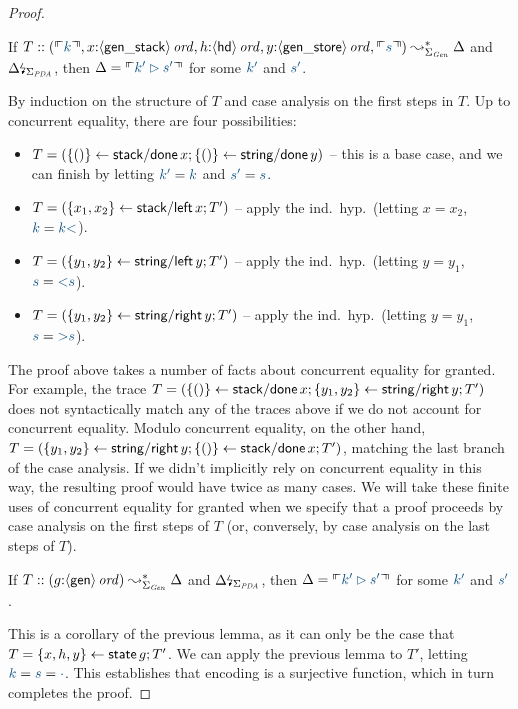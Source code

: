 \begin{proof}
\begin{lemma} If 
$T :: (\ctxinterp{k}, 
       x{:}\istrue{\susp{\sf gen\_stack}}, 
       h{:}\istrue{\susp{\sf hd}},
       y{:}\istrue{\susp{\sf gen\_store}},
       \ctxinterp{s}) 
  \leadsto^*_{\Sigma_{\it Gen}} \Delta$ and
${\Delta}{\mbox{\lightning}}_{\Sigma_{\it
      PDA}}$, then $\Delta = \ctxinterp{k' \rhd s'}$ for some $\obj{k'}$
and $\obj{s'}$.
\end{lemma}
\noindent
By induction on the structure of $T$ and case analysis on the 
first steps in $T$. Up to concurrent equality, there
are four possibilities:
\smallskip
\begin{itemize}
\item $T = (\{{()}\} \leftarrow {{\sf stack/done}\,x}; \{{()}\} \leftarrow {{\sf
      string/done}\,y})$ -- this is a base case, and we can finish by
  letting $\obj{k'} = \obj{k}$ and $\obj{s'} = \obj{s}$.
\item $T = (\{{x_1,x_2}\} \leftarrow {{\sf stack/left}\,x}; T')$ -- apply 
  the ind.~hyp.~(letting $x = x_2$, $\obj{k} =
  \obj{k{\sf <}}$).
\item $T = (\{{y_1,y_2}\} \leftarrow {{\sf string/left}\,y}; T')$ -- apply
  the ind.~hyp.~(letting $y = y_1$, $\obj{s} =
  \obj{{\sf <}s}$).
\item $T = (\{{y_1,y_2}\} \leftarrow {{\sf string/right}\,y}; T')$ -- apply
  the ind.~hyp.~(letting $y = y_1$, $\obj{s} =
  \obj{{\sf >}s}$).
\end{itemize}
\smallskip 
The proof above takes
a number of facts about concurrent equality for granted. 
%
For example, the trace $T = (\{{()}\} \leftarrow {{\sf stack/done}\,x};
\{{y_1,y_2}\} \leftarrow {{\sf string/right}\,y}; T')$ does not syntactically
match any of the traces above if we do not account for concurrent
equality. Modulo concurrent equality, on the other hand, $T =
(\{{y_1,y_2}\} \leftarrow {{\sf string/right}\,y}; \{{()}\} \leftarrow {{\sf
    stack/done}\,x}; T')$, matching the last branch of the case
analysis.  If we didn't implicitly rely on concurrent equality in this
way, the resulting proof would have twice as many cases.  We will take
these finite uses of concurrent equality for granted when we specify
that a proof proceeds by case analysis on the first steps of $T$ (or,
conversely, by case analysis on the last steps of $T$). 

\begin{lemma} If 
$T :: (g{:}{\langle {\sf gen} \rangle}\,{{\it ord}}) 
  \leadsto^*_{\Sigma_{\it Gen}} \Delta$ and
${\Delta}{\mbox{\lightning}}_{\Sigma_{\it
      PDA}}$, then $\Delta = \ctxinterp{k' \rhd s'}$ for some $\obj{k'}$
and $\obj{s'}$.
\end{lemma}
\noindent
This is a corollary of the previous lemma, as it can only
be the case that $T = \{{x,h,y}\} \leftarrow {{\sf state}\,g}; T'$. We can apply the previous
lemma to $T'$, letting $\obj{k} = \obj{s} = \obj{\cdot}$.
This establishes that encoding is a surjective function, which in turn
completes the proof. 
\end{proof}

